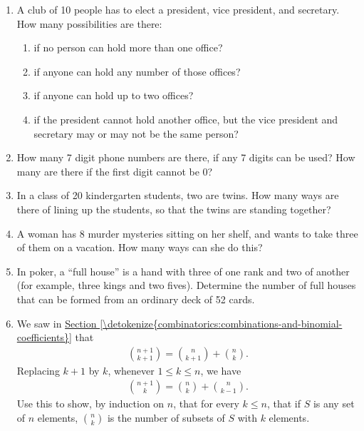 \documentclass[letterpaper,10pt,english]{sphinxmanual}
\begin{document}
\begin{enumerate}
\begin{enumerate}
\end{enumerate}

\item {} 
\sphinxAtStartPar
A club of 10 people has to elect a president, vice president, and secretary. How many possibilities are there:
\begin{enumerate}
%
\item {} 
\sphinxAtStartPar
if no person can hold more than one office?

\item {} 
\sphinxAtStartPar
if anyone can hold any number of those offices?

\item {} 
\sphinxAtStartPar
if anyone can hold up to two offices?

\item {} 
\sphinxAtStartPar
if the president cannot hold another office, but the vice president and secretary may or may not be the same person?

\end{enumerate}

\item {} 
\sphinxAtStartPar
How many 7 digit phone numbers are there, if any 7 digits can be used? How many are there if the first digit cannot be 0?

\item {} 
\sphinxAtStartPar
In a class of 20 kindergarten students, two are twins. How many ways are there of lining up the students, so that the twins are standing together?

\item {} 
\sphinxAtStartPar
A woman has 8 murder mysteries sitting on her shelf, and wants to take three of them on a vacation. How many ways can she do this?

\item {} 
\sphinxAtStartPar
In poker, a “full house” is a hand with three of one rank and two of another (for example, three kings and two fives). Determine the number of full houses that can be formed from an ordinary deck of 52 cards.

\item {} 
\sphinxAtStartPar
We saw in \hyperref[\detokenize{combinatorics:combinations-and-binomial-coefficients}]{Section \ref{\detokenize{combinatorics:combinations-and-binomial-coefficients}}} that
\begin{equation*}
\begin{split}\binom{n+1}{k+1} = \binom{n}{k+1} + \binom{n}{k}.\end{split}
\end{equation*}
\sphinxAtStartPar
Replacing \(k + 1\) by \(k\), whenever \(1 \leq k \leq n\), we have
\begin{equation*}
\begin{split}\binom{n+1}{k} = \binom{n}{k} + \binom{n}{k-1}.\end{split}
\end{equation*}
\sphinxAtStartPar
Use this to show, by induction on \(n\), that for every \(k \leq n\), that if \(S\) is any set of \(n\) elements, \(\binom{n}{k}\) is the number of subsets of \(S\) with \(k\) elements.


\end{enumerate}
\end{document}
